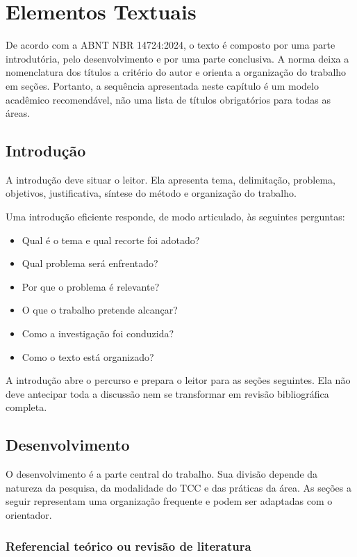 \chapter{Elementos Textuais}

De acordo com a ABNT NBR 14724:2024, o texto é composto por uma parte introdutória, pelo desenvolvimento e por uma parte conclusiva. A norma deixa a nomenclatura dos títulos a critério do autor e orienta a organização do trabalho em seções. Portanto, a sequência apresentada neste capítulo é um modelo acadêmico recomendável, não uma lista de títulos obrigatórios para todas as áreas.

\section{Introdução}

A introdução deve situar o leitor. Ela apresenta tema, delimitação, problema, objetivos, justificativa, síntese do método e organização do trabalho.

Uma introdução eficiente responde, de modo articulado, às seguintes perguntas:

\begin{itemize}
  \item Qual é o tema e qual recorte foi adotado?
  \item Qual problema será enfrentado?
  \item Por que o problema é relevante?
  \item O que o trabalho pretende alcançar?
  \item Como a investigação foi conduzida?
  \item Como o texto está organizado?
\end{itemize}

A introdução abre o percurso e prepara o leitor para as seções seguintes. Ela não deve antecipar toda a discussão nem se transformar em revisão bibliográfica completa.

\section{Desenvolvimento}

O desenvolvimento é a parte central do trabalho. Sua divisão depende da natureza da pesquisa, da modalidade do TCC e das práticas da área. As seções a seguir representam uma organização frequente e podem ser adaptadas com o orientador.

\subsection{Referencial teórico ou revisão de literatura}

